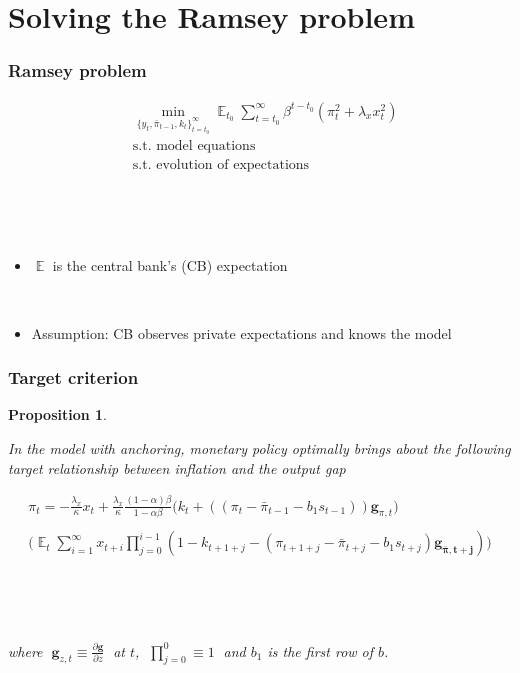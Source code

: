 \documentclass[10pt]{beamer}
\DeclareMathOperator{\E}{\mathbb{E}}
\newtheorem{prop}{Proposition}
\begin{document}
\section{Solving the Ramsey problem}

\begin{frame}
	\frametitle{Ramsey problem}
	 \begin{align*}
& \min_{ \{y_t, \bar{\pi}_{t-1}, k_t \}_{t=t_0}^{\infty}} \E_{t_0}\sum_{t=t_0}^{\infty} \beta^{t-t_0} (\pi_t^2  + \lambda_x x_t^2 )  \\
& \text{s.t. model equations} \\
& \text{s.t. evolution of expectations} 
\end{align*}

\

\

\begin{itemize}
\item $\E$ is the central bank's (CB) expectation

\

\item Assumption: CB observes private expectations and knows the model
\end{itemize}

 

\end{frame}


\begin{frame}
	\frametitle{Target criterion}
	\label{anchTC}
	
	\begin{prop} 

\

In the model with anchoring, monetary policy optimally brings about the following target relationship between inflation and the output gap
	
\begin{align*}
\pi_t  = -\frac{\lambda_x}{\kappa}x_t + \frac{\lambda_x}{\kappa}\frac{(1-\alpha)\beta}{1-\alpha\beta} \bigg(k_t+((\pi_t - \bar{\pi}_{t-1}-b_1 s_{t-1}))\mathbf{g}_{\pi,t}\bigg) \\
\\
\bigg(\E_t\sum_{i=1}^{\infty}x_{t+i}\prod_{j=0}^{i-1}(1-k_{t+1+j} - (\pi_{t+1+j} - \bar{\pi}_{t+j}-b_1 s_{t+j})\mathbf{g_{\bar{\pi}, t+j}}) \bigg)
 \label{target}
\end{align*}

\

\

where $\; \mathbf{g}_{z,t} \equiv \frac{\partial \mathbf{g}}{\partial z}\;$ at $t$, $\; \prod_{j=0}^{0} \equiv 1 \; $ and $b_1$ is the first row of $b$.
	\end{prop}

\vspace{-0.1cm}

\hfill \hyperlink{generalTC}{}

\end{frame}
\end{document}
